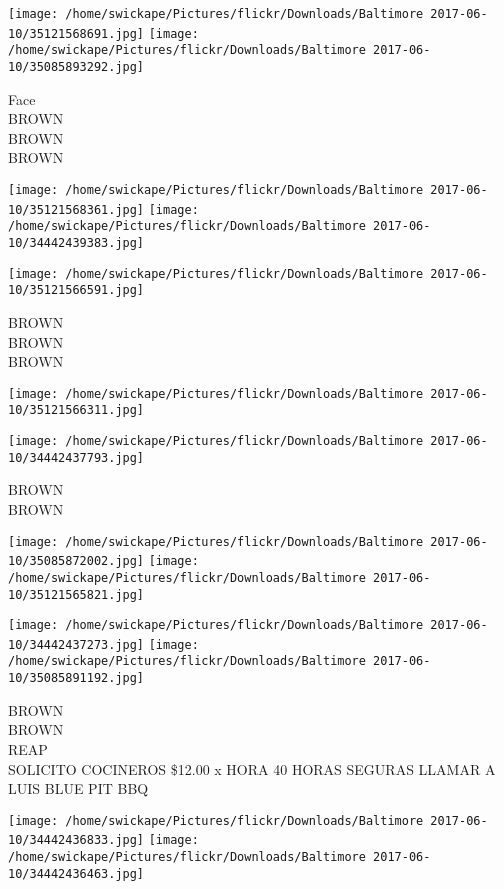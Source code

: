 \documentclass[10pt,letterpaper]{article}
\begin{document}
\texttt{[image: /home/swickape/Pictures/flickr/Downloads/Baltimore 2017-06-10/35121568691.jpg]}
\texttt{[image: /home/swickape/Pictures/flickr/Downloads/Baltimore 2017-06-10/35085893292.jpg]}

Face\\
BROWN\\
BROWN\\
BROWN
\pagebreak

\texttt{[image: /home/swickape/Pictures/flickr/Downloads/Baltimore 2017-06-10/35121568361.jpg]}
\texttt{[image: /home/swickape/Pictures/flickr/Downloads/Baltimore 2017-06-10/34442439383.jpg]}

\vspace{0.25in}
\texttt{[image: /home/swickape/Pictures/flickr/Downloads/Baltimore 2017-06-10/35121566591.jpg]}

BROWN\\
BROWN\\
BROWN
\pagebreak

\texttt{[image: /home/swickape/Pictures/flickr/Downloads/Baltimore 2017-06-10/35121566311.jpg]}

\vspace{0.25in}
\texttt{[image: /home/swickape/Pictures/flickr/Downloads/Baltimore 2017-06-10/34442437793.jpg]}

BROWN\\
BROWN
\pagebreak

\texttt{[image: /home/swickape/Pictures/flickr/Downloads/Baltimore 2017-06-10/35085872002.jpg]}
\texttt{[image: /home/swickape/Pictures/flickr/Downloads/Baltimore 2017-06-10/35121565821.jpg]}

\texttt{[image: /home/swickape/Pictures/flickr/Downloads/Baltimore 2017-06-10/34442437273.jpg]}
\texttt{[image: /home/swickape/Pictures/flickr/Downloads/Baltimore 2017-06-10/35085891192.jpg]}

BROWN\\
BROWN\\
REAP\\
SOLICITO COCINEROS \$12.00 x HORA 40 HORAS SEGURAS LLAMAR A LUIS BLUE PIT BBQ
\pagebreak

\texttt{[image: /home/swickape/Pictures/flickr/Downloads/Baltimore 2017-06-10/34442436833.jpg]}
\texttt{[image: /home/swickape/Pictures/flickr/Downloads/Baltimore 2017-06-10/34442436463.jpg]}
\end{document}
